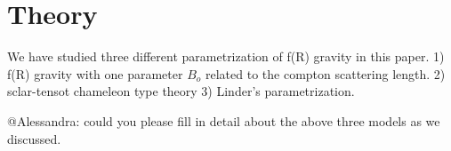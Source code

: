 \section{Theory}
\label{sec:theory}

We have studied three different parametrization of f(R) gravity in this paper.
1) f(R) gravity with one parameter $B_o$ related to the compton scattering length.
2) sclar-tensot chameleon type theory
3) Linder's parametrization.

@Alessandra: could you please fill in detail about the above three models as we discussed.



